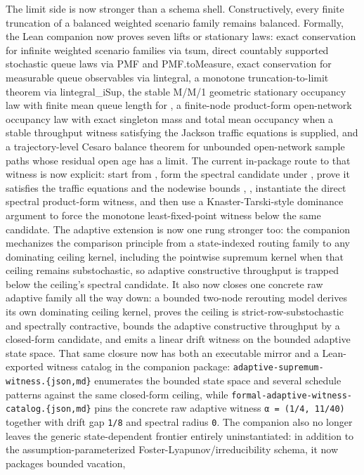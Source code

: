 \documentclass[
]{article}
\begin{document}
The limit side is now stronger than a schema shell. Constructively,
every finite truncation of a balanced weighted scenario family remains
balanced. Formally, the Lean companion now proves seven lifts or
stationary laws: exact conservation for infinite weighted scenario
families via tsum, direct countably supported stochastic queue laws via
PMF and PMF.toMeasure, exact conservation for measurable queue
observables via lintegral, a monotone truncation-to-limit theorem via
lintegral\_iSup, the stable M/M/1 geometric stationary occupancy law
with finite mean queue length for , a finite-node product-form
open-network occupancy law with exact singleton mass and total mean
occupancy when a stable throughput witness satisfying the Jackson
traffic equations is supplied, and a trajectory-level Cesaro balance
theorem for unbounded open-network sample paths whose residual open age
has a limit. The current in-package route to that witness is now
explicit: start from , form the spectral candidate under , prove it
satisfies the traffic equations and the nodewise bounds , , instantiate
the direct spectral product-form witness, and then use a
Knaster-Tarski-style dominance argument to force the monotone
least-fixed-point witness below the same candidate. The adaptive
extension is now one rung stronger too: the companion mechanizes the
comparison principle from a state-indexed routing family to any
dominating ceiling kernel, including the pointwise supremum kernel when
that ceiling remains substochastic, so adaptive constructive throughput
is trapped below the ceiling's spectral candidate. It also now closes
one concrete raw adaptive family all the way down: a bounded two-node
rerouting model derives its own dominating ceiling kernel, proves the
ceiling is strict-row-substochastic and spectrally contractive, bounds
the adaptive constructive throughput by a closed-form candidate, and
emits a linear drift witness on the bounded adaptive state space. That
same closure now has both an executable mirror and a Lean-exported
witness catalog in the companion package:
\texttt{adaptive-supremum-witness.\{json,md\}} enumerates the bounded
state space and several schedule patterns against the same closed-form
ceiling, while \texttt{formal-adaptive-witness-catalog.\{json,md\}} pins
the concrete raw adaptive witness \texttt{α\ =\ (1/4,\ 11/40)} together
with drift gap \texttt{1/8} and spectral radius \texttt{0}. The
companion also no longer leaves the generic state-dependent frontier
entirely uninstantiated: in addition to the assumption-parameterized
Foster-Lyapunov/irreducibility schema, it now packages bounded vacation,
\end{document}

